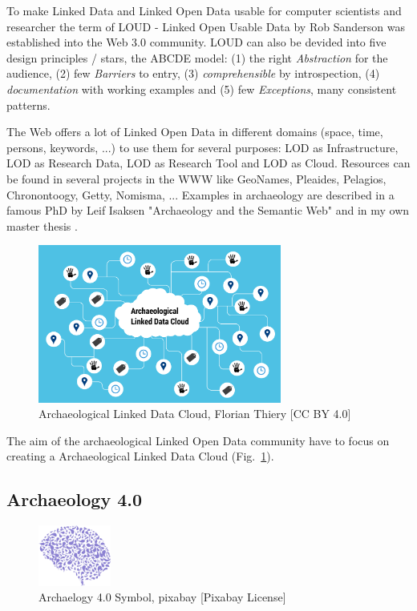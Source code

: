 \documentclass[twocolumn]{autart}
\begin{document}
To make Linked Data and Linked Open Data usable for computer scientists and researcher the term of LOUD - Linked Open Usable Data \cite{sanderson_loud} by Rob Sanderson was established into the Web 3.0 community. LOUD can also be devided into five design principles / stars, the ABCDE model: (1) the right \textit{Abstraction} for the audience, (2) few \textit{Barriers} to entry, (3) \textit{comprehensible} by introspection, (4) \textit{documentation} with working examples and (5) few \textit{Exceptions}, many consistent patterns.

The Web offers a lot of Linked Open Data in different domains (space, time, persons, keywords, ...) to use them for several purposes: LOD as Infrastructure, LOD as Research Data, LOD as Research Tool and LOD as Cloud. Resources can be found in several projects in the WWW like GeoNames, Pleaides, Pelagios, Chronontoogy, Getty, Nomisma, ... Examples in archaeology are described in a famous PhD by Leif Isaksen "Archaeology and the Semantic Web" \cite{isaksen_archaeology} and in my own master thesis \cite{thiery_geinarfa}.

\begin{figure}[!htb]
\begin{center}
\includegraphics[width=8cm]{Archaeological_Linked_Data_Cloud_(ALDC).png}
\caption{Archaeological Linked Data Cloud, Florian Thiery [CC BY 4.0]}
\label{figaaldc}
\end{center}
\end{figure}

The aim of the archaeological Linked Open Data community have to focus on creating a Archaeological Linked Data Cloud (Fig.~\ref{figaaldc}).

\subsection{Archaeology 4.0}

\begin{figure}[!htb]
\begin{center}
\includegraphics[height=2cm]{a40.png}    %
\caption{Archaelogy 4.0 Symbol, pixabay [Pixabay License]}  %
\label{figa40symbol}                                 %
\end{center}                                 %
\end{figure}
\end{document}
